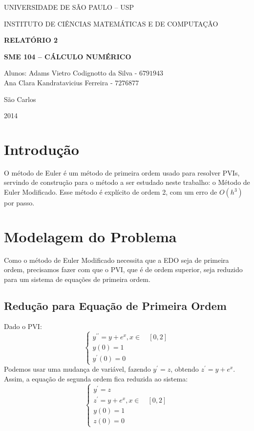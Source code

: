 \documentclass[10pt,a4paper]{article}
\begin{document}
\thispagestyle{empty}
\begin{center}
	UNIVERSIDADE DE SÃO PAULO – USP
	
	INSTITUTO DE CIÊNCIAS MATEMÁTICAS E DE COMPUTAÇÃO
	
	
	
	\vspace{7cm}
	
	\Large{\textbf{RELATÓRIO 2}}
	 
	\Large{\textbf{SME 104 – CÁLCULO NUMÉRICO}}
	
	\vspace{6cm}
	
	Alunos: Adams Vietro Codignotto da Silva - $6791943$ \\ Ana Clara Kandratavicius Ferreira - $7276877$
	
	\vspace{6cm}
	
	São Carlos
	
	2014
\end{center}
\section{Introdução}
O método de Euler é um método de primeira ordem usado para resolver PVIs, servindo de construção para o método a ser estudado neste trabalho: o Método de Euler Modificado. Esse método é explícito de ordem 2, com um erro de $O(h^3)$ por passo.\\
\section{Modelagem do Problema}
Como o método de Euler Modificado necessita que a EDO seja de primeira ordem, precisamos fazer com que o PVI, que é de ordem superior, seja reduzido para um sistema de equações de primeira ordem.\\
\subsection{Redução para Equação de Primeira Ordem}
Dado o PVI:
$$
\begin{cases}
y^{\prime\prime}=y+\textit{e}^x, x\in \quad [0,2]\\
y(0)=1\\
y^{\prime}(0)=0
\end{cases}
$$
Podemos usar uma mudança de variável, fazendo $y^{\prime}=z$, obtendo $z^{\prime}=y+\textit{e}^x$. Assim, a equação de segunda ordem fica reduzida ao sistema:
$$
\begin{cases}
y^{\prime}=z\\
z^{\prime}=y+\textit{e}^x, x\in \quad [0,2]\\
y(0)=1\\
z(0)=0
\end{cases}
$$
\end{document}
